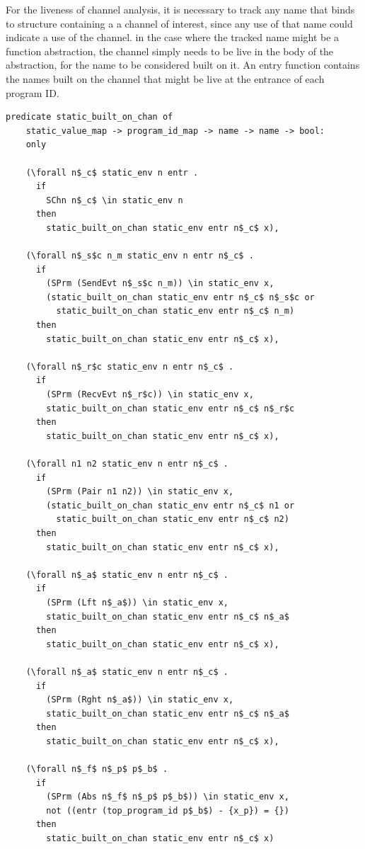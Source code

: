 \documentclass{article}
\begin{document}
For the liveness of channel analysis, it is necessary to track any name that binds to structure
containing a a channel of interest, since any use of that name could indicate a use of the
channel. in the case where the tracked name might be a function abstraction, the channel simply
needs to be live in the body of the abstraction, for the name to be considered built on it.
An entry function contains the names built on the channel that might be live at the entrance
of each program ID.

\begin{lstlisting}[language=logic, mathescape]
  predicate static_built_on_chan of
    static_value_map -> program_id_map -> name -> name -> bool:
    only

    (\forall n$_c$ static_env n entr .
      if 
        SChn n$_c$ \in static_env n 
      then 
        static_built_on_chan static_env entr n$_c$ x),

    (\forall n$_s$c n_m static_env n entr n$_c$ . 
      if
        (SPrm (SendEvt n$_s$c n_m)) \in static_env x,
        (static_built_on_chan static_env entr n$_c$ n$_s$c or
          static_built_on_chan static_env entr n$_c$ n_m)
      then 
        static_built_on_chan static_env entr n$_c$ x),

    (\forall n$_r$c static_env n entr n$_c$ . 
      if  
        (SPrm (RecvEvt n$_r$c)) \in static_env x,
        static_built_on_chan static_env entr n$_c$ n$_r$c
      then 
        static_built_on_chan static_env entr n$_c$ x),

    (\forall n1 n2 static_env n entr n$_c$ . 
      if  
        (SPrm (Pair n1 n2)) \in static_env x,
        (static_built_on_chan static_env entr n$_c$ n1 or
          static_built_on_chan static_env entr n$_c$ n2)
      then 
        static_built_on_chan static_env entr n$_c$ x),

    (\forall n$_a$ static_env n entr n$_c$ .
      if
        (SPrm (Lft n$_a$)) \in static_env x,
        static_built_on_chan static_env entr n$_c$ n$_a$
      then 
        static_built_on_chan static_env entr n$_c$ x),

    (\forall n$_a$ static_env n entr n$_c$ .
      if
        (SPrm (Rght n$_a$)) \in static_env x,
        static_built_on_chan static_env entr n$_c$ n$_a$
      then 
        static_built_on_chan static_env entr n$_c$ x),

    (\forall n$_f$ n$_p$ p$_b$ .
      if
        (SPrm (Abs n$_f$ n$_p$ p$_b$)) \in static_env x,
        not ((entr (top_program_id p$_b$) - {x_p}) = {})
      then
        static_built_on_chan static_env entr n$_c$ x)
  \end{lstlisting}
\end{document}
